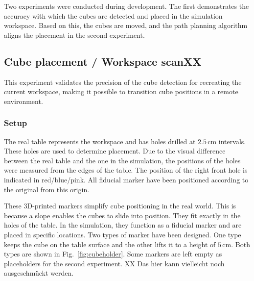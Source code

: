 \documentclass{bmvc2k}
\begin{document}
Two experiments were conducted during development. The first demonstrates the accuracy with which the cubes are detected and placed in the simulation workspace. Based on this, the cubes are moved, and the path planning algorithm aligns the placement in the second experiment.

\subsection{Cube placement / Workspace scanXX}
\label{ex:placement}
This experiment validates the precision of the cube detection for recreating the current workspace, making it possible to transition cube positions in a remote environment.

\subsubsection{Setup}
The real table represents the workspace and has holes drilled at $2.5\,\mathrm{cm}$ intervals. These holes are used to determine placement. Due to the visual difference between the real table and the one in the simulation, the positions of the holes were measured from the edges of the table. The position of the right front hole is indicated in red/blue/pink. All fiducial marker have been positioned according to the original from this origin.

These 3D-printed markers simplify cube positioning in the real world. This is because a slope enables the cubes to slide into position. They fit exactly in the holes of the table. In the simulation, they function as a fiducial marker and are placed in specific locations.
Two types of marker have been designed. One type keeps the cube on the table surface and the other lifts it to a height of $5\,\mathrm{cm}$. Both types are shown in Fig.~\ref{fig:cubeholder}.
Some markers are left empty as placeholders for the second experiment.
XX Das hier kann vielleicht noch ausgeschmückt werden.

\end{document}
